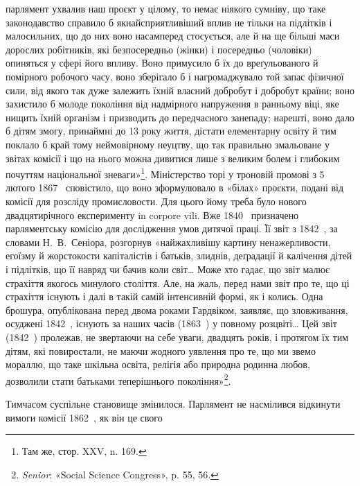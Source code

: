 \parcont{}  %
парлямент ухвалив наш проєкт у цілому, то немає ніякого сумніву,
що таке законодавство справило б якнайсприятливіший
вплив не тільки на підлітків і малосильних, що до них воно
насамперед стосується, але й на ще більші маси дорослих робітників,
які безпосередньо (жінки) і посередньо (чоловіки) опиняться
у сфері його впливу. Воно примусило б їх до вреґульованого
й помірного робочого часу, воно зберігало б і нагромаджувало
той запас фізичної сили, від якого так дуже залежить їхній
власний добробут і добробут країни; воно захистило б молоде
покоління від надмірного напруження в ранньому віці, яке
нищить їхній організм і призводить до передчасного занепаду;
нарешті, воно дало б дітям змогу, принаймні до 13 року життя,
дістати елементарну освіту й тим поклало б край тому неймовірному
неуцтву, що так правильно змальоване у звітах комісії
і що на нього можна дивитися лише з великим болем і глибоким
почуттям національної зневаги»\footnote{
Там же, стор. XXV, n. 169.
}. Міністерство торі у троновій
промові з 5 лютого 1867~ сповістило, що воно зформулювало в
«білах» проєкти, подані від комісії для розсліду промисловости.
Для цього йому треба було нового двадцятирічного
експерименту in corpore vili. Вже 1840~ призначено парляментську
комісію для дослідження умов дитячої праці. Її звіт з 1842~,
за словами Н.~В.~Сеніора, розгорнув «найжахливішу картину
ненажерливости, егоїзму й жорстокости капіталістів і батьків,
злиднів, деґрадації й калічення дітей і підлітків, що її навряд
чи бачив коли світ\dots{} Може хто гадає, що звіт малює страхіття
якогось минулого століття. Але, на жаль, перед нами звіт про
те, що ці страхіття існують і далі в такій самій інтенсивній формі,
як і колись. Одна брошура, опублікована перед двома роками
Гардвіком, заявляє, що зловживання, осуджені 1842~,
існують за наших часів (1863~) у повному розцвіті\dots{} Цей звіт
(1842~) пролежав, не звертаючи на себе уваги, двадцять років,
і протягом їх тим дітям, які повиростали, не маючи жодного
уявлення про те, що ми звемо мораллю, що таке шкільна освіта,
релігія або природна родинна любов, дозволили стати батьками
теперішнього покоління»\footnote{
\emph{Senior}: «Social Science Congress», p. 55, 56.
}.

Тимчасом суспільне становище змінилося. Парлямент не
насмілився відкинути вимоги комісії 1862~, як він це свого
\parbreak{}  %
